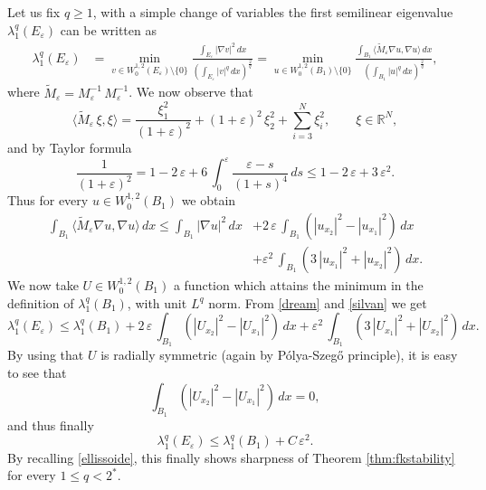 \documentclass{amsart}
\theoremstyle{definition}
\newtheorem{remark}[lemma]{Remark}
\numberwithin{equation}{section}
\begin{document}
Let us fix $q\ge 1$, with a simple change of variables the first semilinear eigenvalue $\lambda^q_1(E_\varepsilon)$ can be written as
\begin{equation}
\label{dream}
\begin{split}
\lambda^q_1(E_\varepsilon)&=\min_{v\in W^{1,2}_0(E_\varepsilon)\setminus\{0\}} \frac{\displaystyle\int_{E_\varepsilon} |\nabla v|^2\, dx}{\displaystyle\left(\int_{E_\varepsilon} |v|^q\, dx\right)^\frac{2}{q}}=\min_{u\in W^{1,2}_0(B_1)\setminus\{0\}}\frac{\displaystyle\int_{B_1}\langle \widetilde M_\varepsilon \nabla u,\nabla u\rangle\,dx}{\displaystyle\left(\int_{B_1} |u|^q\, dx\right)^\frac{2}{q}},
\end{split}
\end{equation}
where $\widetilde M_\varepsilon=M_\varepsilon^{-1}\,M_\varepsilon^{-1}$. We now observe that
\[
\langle \widetilde M_\varepsilon\, \xi,\xi\rangle=\frac{\xi_1^2}{(1+\varepsilon)^2}+(1+\varepsilon)^2\,\xi_2^2+\sum_{i=3}^N \xi_i^2,\qquad \xi\in\mathbb{R}^N,
\]
and by Taylor formula
\[
\frac{1}{(1+\varepsilon)^2}=1-2\,\varepsilon+6\,\int_0^\varepsilon \frac{\varepsilon-s}{(1+s)^4}\,ds\le 1-2\,\varepsilon+3\,\varepsilon^2.
\]
Thus for every $u\in W^{1,2}_0(B_1)$ we obtain
\begin{equation}
\label{silvan}
\begin{split}
\int_{B_1}\langle \widetilde M_\varepsilon \nabla u,\nabla u\rangle\,dx\le \int_{B_1} |\nabla u|^2\,dx&+2\,\varepsilon\,\int_{B_1} \left(|u_{x_2}|^2-|u_{x_1}|^2\right)\,dx\\
&+\varepsilon^2\,\int_{B_1} \left(3\,|u_{x_1}|^2+|u_{x_2}|^2\right)\,dx.
\end{split}
\end{equation}
We now take $U\in W^{1,2}_0(B_1)$ a function which attains the minimum in the definition of $\lambda^q_1(B_1)$, with unit $L^q$ norm. From \eqref{dream} and \eqref{silvan} we get
\[
\lambda^q_1(E_\varepsilon)\le \lambda^q_1(B_1)+2\,\varepsilon\,\int_{B_1} \left(|U_{x_2}|^2-|U_{x_1}|^2\right)\,dx+\varepsilon^2\,\int_{B_1} \left(3\,|U_{x_1}|^2+|U_{x_2}|^2\right)\,dx.
\]
By using that $U$ is radially symmetric (again by P\'olya-Szeg\H{o} principle), it is easy to see that  
\[
\int_{B_1} \left(|U_{x_2}|^2-|U_{x_1}|^2\right)\,dx=0,
\]
and thus finally
\[
\lambda^q_1(E_\varepsilon)\le \lambda^q_1(B_1)+C\,\varepsilon^2.
\]
By recalling \eqref{ellissoide}, this finally shows sharpness of Theorem \ref{thm:fkstability} for every $1\le q< 2^*$.
\end{document}
